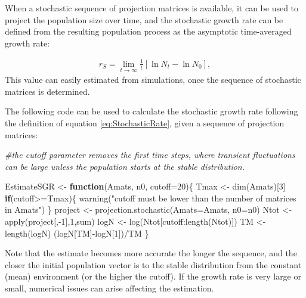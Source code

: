 \documentclass[
]{book}
\newenvironment{Shaded}{\begin{snugshade}}{\end{snugshade}}
\newcommand{\AttributeTok}[1]{\textcolor[rgb]{0.77,0.63,0.00}{#1}}
\newcommand{\CommentTok}[1]{\textcolor[rgb]{0.56,0.35,0.01}{\textit{#1}}}
\newcommand{\ControlFlowTok}[1]{\textcolor[rgb]{0.13,0.29,0.53}{\textbf{#1}}}
\newcommand{\DecValTok}[1]{\textcolor[rgb]{0.00,0.00,0.81}{#1}}
\newcommand{\FunctionTok}[1]{\textcolor[rgb]{0.00,0.00,0.00}{#1}}
\newcommand{\NormalTok}[1]{#1}
\newcommand{\OtherTok}[1]{\textcolor[rgb]{0.56,0.35,0.01}{#1}}
\newcommand{\SpecialCharTok}[1]{\textcolor[rgb]{0.00,0.00,0.00}{#1}}
\newcommand{\StringTok}[1]{\textcolor[rgb]{0.31,0.60,0.02}{#1}}
\begin{document}
When a stochastic sequence of projection matrices is available, it can be used to project the population size over time, and the stochastic growth rate can be defined from the resulting population process as the asymptotic time-averaged growth rate:

\begin{align}
r_S=\lim_{t\to\infty}\frac{1}{t}[\ln N_t-\ln N_0],
\label{eq:StochasticRate}
\end{align}
This value can easily estimated from simulations, once the sequence of stochastic matrices is determined.

The following code can be used to calculate the stochastic growth rate following the definition of equation \eqref{eq:StochasticRate}, given a sequence of projection matrices:

\begin{Shaded}
\begin{Highlighting}[]
\CommentTok{\#the cutoff parameter removes the first time steps, where transient fluctuations can be large unless the population starts at the stable distribution. }

\NormalTok{EstimateSGR }\OtherTok{\textless{}{-}} \ControlFlowTok{function}\NormalTok{(Amats, n0, }\AttributeTok{cutoff=}\DecValTok{20}\NormalTok{)\{}
\NormalTok{  Tmax }\OtherTok{\textless{}{-}} \FunctionTok{dim}\NormalTok{(Amats)[}\DecValTok{3}\NormalTok{]}
    \ControlFlowTok{if}\NormalTok{(cutoff}\SpecialCharTok{\textgreater{}=}\NormalTok{Tmax)\{}
      \FunctionTok{warning}\NormalTok{(}\StringTok{"cutoff must be lower than the number of matrices in Amats"}\NormalTok{)}
\NormalTok{      \}}
\NormalTok{  project }\OtherTok{\textless{}{-}} \FunctionTok{projection.stochastic}\NormalTok{(}\AttributeTok{Amats=}\NormalTok{Amats, }\AttributeTok{n0=}\NormalTok{n0) }
\NormalTok{  Ntot }\OtherTok{\textless{}{-}} \FunctionTok{apply}\NormalTok{(project[,}\SpecialCharTok{{-}}\DecValTok{1}\NormalTok{],}\DecValTok{1}\NormalTok{,sum)}
\NormalTok{  logN }\OtherTok{\textless{}{-}} \FunctionTok{log}\NormalTok{(Ntot[cutoff}\SpecialCharTok{:}\FunctionTok{length}\NormalTok{(Ntot)])}
\NormalTok{  TM }\OtherTok{\textless{}{-}} \FunctionTok{length}\NormalTok{(logN)}
\NormalTok{  (logN[TM]}\SpecialCharTok{{-}}\NormalTok{logN[}\DecValTok{1}\NormalTok{])}\SpecialCharTok{/}\NormalTok{TM}
\NormalTok{\}}
\end{Highlighting}
\end{Shaded}

Note that the estimate becomes more accurate the longer the sequence, and the closer the initial population vector is to the stable distribution from the constant (mean) environment (or the higher the cutoff). If the growth rate is very large or small, numerical issues can arise affecting the estimation.
\end{document}
